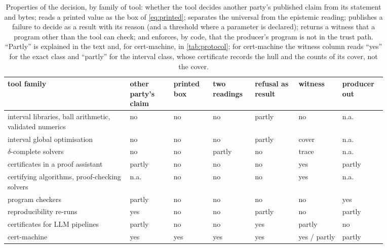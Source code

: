 \documentclass[preprint,11pt,a4paper]{elsarticle}
\theoremstyle{definition}
\begin{document}
\begin{table}[htbp]\centering\footnotesize\setlength{\tabcolsep}{3pt}
\caption{Properties of the decision, by family of tool: whether the tool decides another party's published claim from its statement and bytes; reads a printed value as the box of \cref{eq:printed}; separates the universal from the epistemic reading; publishes a failure to decide as a result with its reason (and a threshold where a parameter is declared); returns a witness that a program other than the tool can check; and enforces, by code, that the producer's program is not in the trust path. ``Partly'' is explained in the text and, for cert-machine, in \cref{tab:protocol}; for cert-machine the witness column reads ``yes'' for the exact class and ``partly'' for the interval class, whose certificate records the hull and the counts of its cover, not the cover.}\label{tab:related}
\begin{tabular}{@{}L{0.29\linewidth}>{\centering\arraybackslash}p{0.105\linewidth}>{\centering\arraybackslash}p{0.09\linewidth}>{\centering\arraybackslash}p{0.09\linewidth}>{\centering\arraybackslash}p{0.105\linewidth}>{\centering\arraybackslash}p{0.105\linewidth}>{\centering\arraybackslash}p{0.09\linewidth}@{}}\toprule
tool family & other party's claim & printed box & two readings & refusal as result & witness & producer out \\\midrule
interval libraries, ball arithmetic, validated numerics~\citep{Rump99,Rump10,Tucker11,Johansson17} & no & no & no & partly & no & n.a. \\
interval global optimisation~\citep{HansenWalster04,Rump18global} & no & no & no & partly & cover & n.a. \\
$\delta$-complete solvers~\citep{dReal13,Kong18,Gao14proof} & no & no & partly & no & trace & n.a. \\
certificates in a proof assistant~\citep{SolovyevHales13,MartinDorel16,Mahboubi19} & partly & no & no & no & yes & partly \\
certifying algorithms, proof-checking solvers~\citep{McConnell11,Wetzler14,CakeLPR21} & n.a. & no & no & no & yes & n.a. \\
program checkers~\citep{BlumKannan95} & partly & no & no & no & no & yes \\
reproducibility re-runs~\citep{Rougier17,ReproBuilds22} & yes & no & no & partly & no & partly \\
certificates for LLM pipelines~\citep{Koomullil26,Li26} & partly & no & no & yes & partly & no \\
cert-machine & yes & yes & yes & yes & yes / partly & partly \\
\bottomrule\end{tabular}
\end{table}
\end{document}
